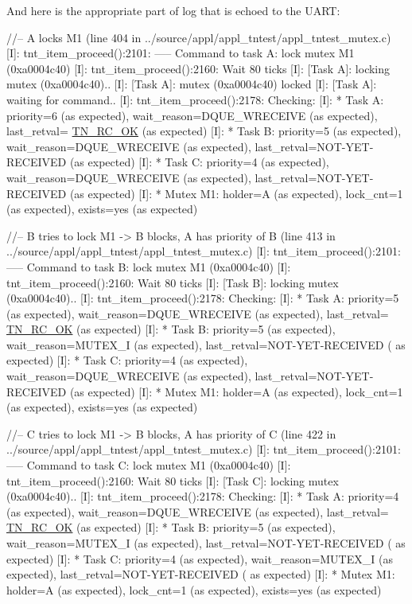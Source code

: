 And here is the appropriate part of log that is echoed to the U\+A\+RT\+:


\begin{DoxyCode}
\textcolor{comment}{//-- A locks M1 (line 404 in ../source/appl/appl\_tntest/appl\_tntest\_mutex.c) }
[I]: tnt\_item\_proceed():2101: ----- Command to task A: lock mutex M1 (0xa0004c40) 
[I]: tnt\_item\_proceed():2160: Wait 80 ticks 
[I]: [Task A]: locking mutex (0xa0004c40).. 
[I]: [Task A]: mutex (0xa0004c40) locked 
[I]: [Task A]: waiting for command.. 
[I]: tnt\_item\_proceed():2178: Checking: 
[I]: * Task A: priority=6 (as expected), wait\_reason=DQUE\_WRECEIVE (as expected), last\_retval=
      \hyperlink{tn__common_8h_aa43bd3da1ad4c1e61224b5f23b369876afb291924237186f5765865256c75e639}{TN\_RC\_OK} (as expected) 
[I]: * Task B: priority=5 (as expected), wait\_reason=DQUE\_WRECEIVE (as expected), last\_retval=NOT-YET-
      RECEIVED (as expected) 
[I]: * Task C: priority=4 (as expected), wait\_reason=DQUE\_WRECEIVE (as expected), last\_retval=NOT-YET-
      RECEIVED (as expected) 
[I]: * Mutex M1: holder=A (as expected), lock\_cnt=1 (as expected), exists=yes (as expected) 

\textcolor{comment}{//-- B tries to lock M1 -> B blocks, A has priority of B (line 413 in
       ../source/appl/appl\_tntest/appl\_tntest\_mutex.c) }
[I]: tnt\_item\_proceed():2101: ----- Command to task B: lock mutex M1 (0xa0004c40) 
[I]: tnt\_item\_proceed():2160: Wait 80 ticks 
[I]: [Task B]: locking mutex (0xa0004c40).. 
[I]: tnt\_item\_proceed():2178: Checking: 
[I]: * Task A: priority=5 (as expected), wait\_reason=DQUE\_WRECEIVE (as expected), last\_retval=
      \hyperlink{tn__common_8h_aa43bd3da1ad4c1e61224b5f23b369876afb291924237186f5765865256c75e639}{TN\_RC\_OK} (as expected) 
[I]: * Task B: priority=5 (as expected), wait\_reason=MUTEX\_I (as expected), last\_retval=NOT-YET-RECEIVED (
      as expected) 
[I]: * Task C: priority=4 (as expected), wait\_reason=DQUE\_WRECEIVE (as expected), last\_retval=NOT-YET-
      RECEIVED (as expected) 
[I]: * Mutex M1: holder=A (as expected), lock\_cnt=1 (as expected), exists=yes (as expected) 

\textcolor{comment}{//-- C tries to lock M1 -> B blocks, A has priority of C (line 422 in
       ../source/appl/appl\_tntest/appl\_tntest\_mutex.c) }
[I]: tnt\_item\_proceed():2101: ----- Command to task C: lock mutex M1 (0xa0004c40) 
[I]: tnt\_item\_proceed():2160: Wait 80 ticks 
[I]: [Task C]: locking mutex (0xa0004c40).. 
[I]: tnt\_item\_proceed():2178: Checking: 
[I]: * Task A: priority=4 (as expected), wait\_reason=DQUE\_WRECEIVE (as expected), last\_retval=
      \hyperlink{tn__common_8h_aa43bd3da1ad4c1e61224b5f23b369876afb291924237186f5765865256c75e639}{TN\_RC\_OK} (as expected) 
[I]: * Task B: priority=5 (as expected), wait\_reason=MUTEX\_I (as expected), last\_retval=NOT-YET-RECEIVED (
      as expected) 
[I]: * Task C: priority=4 (as expected), wait\_reason=MUTEX\_I (as expected), last\_retval=NOT-YET-RECEIVED (
      as expected) 
[I]: * Mutex M1: holder=A (as expected), lock\_cnt=1 (as expected), exists=yes (as expected) 


\end{DoxyCode}
